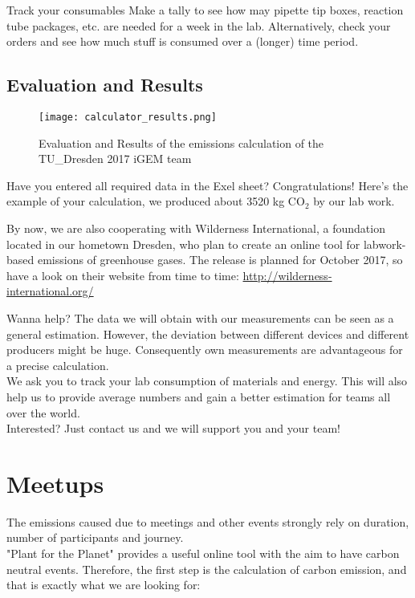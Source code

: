 \begin{suggest}{Track your consumables}
	Make a tally to see how may pipette tip boxes, reaction tube packages, etc. are needed for a week in the lab. Alternatively, check your orders and see how much stuff is consumed over a (longer) time period.
\end{suggest}

\subsection{Evaluation and Results}
\begin{wrapfigure}{r}{8cm}
	\centering
	\texttt{[image: calculator\_results.png]}%
	\caption{Evaluation and Results of the emissions calculation of the TU_Dresden 2017 iGEM team}%
\end{wrapfigure}

Have you entered all required data in the Exel sheet? Congratulations! Here’s the example of your calculation, we produced about 3520 kg CO$_2$ by our lab work.





By now, we are also cooperating with Wilderness International, a foundation located in our hometown Dresden, who plan to create an online tool for labwork-based emissions of greenhouse gases. The release is planned for October 2017, so  have a look on their website from time to time: 
\url{http://wilderness-international.org/} %

\begin{suggest}{Wanna help?}
	The data we will obtain with our measurements can be seen as a general estimation.
	However, the deviation between different devices and different producers might be huge. Consequently own measurements are advantageous for a precise calculation.\\
	We ask you to track your lab consumption of materials and energy. This will also help us to provide average numbers and gain a better estimation for teams all over the world. \\
	Interested? Just contact us and we will support you and your team!
	
\end{suggest}

\section{Meetups}

The emissions caused due to meetings and other events strongly rely on duration, number of participants and journey. \\
"Plant for the Planet" provides a useful online tool with the aim to have carbon neutral events. Therefore, the first step is the calculation of carbon emission, and that is exactly what we are looking for:

